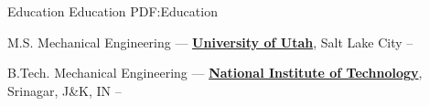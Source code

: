 \documentclass[letterpaper,MMMyyyy,nonstopmode]{simpleresumecv}
\begin{document}
\begin{Body}
\BigGap


\Section
{Education}
{Education}
{PDF:Education}

\Entry
M.S. Mechanical Engineering ---
\href{https://www.utah.edu/}
{\textbf{University of Utah}}, Salt Lake City
\hfill
{} --

\Gap
\Entry
B.Tech. Mechanical Engineering ---
\href{https://nitsri.ac.in/}
{\textbf{National Institute of Technology}}, Srinagar, J\&K, IN
\hfill
{} --


\end{Body}

\BigGap
\UseNoteFont%
\end{document}
